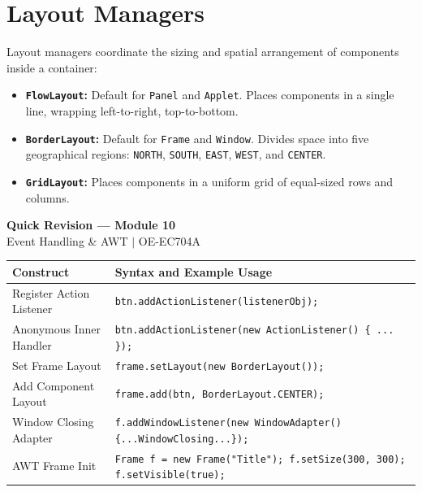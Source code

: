 \documentclass[12pt,a4paper]{article}
\renewcommand{\arraystretch}{1.45}
\begin{document}
\section{Layout Managers}

Layout managers coordinate the sizing and spatial arrangement of components inside a container:
\begin{itemize}[leftmargin=*, itemsep=3.5pt]
  \item \textbf{\texttt{FlowLayout}:} Default for \texttt{Panel} and \texttt{Applet}. Places components in a single line, wrapping left-to-right, top-to-bottom.
  \item \textbf{\texttt{BorderLayout}:} Default for \texttt{Frame} and \texttt{Window}. Divides space into five geographical regions: \texttt{NORTH}, \texttt{SOUTH}, \texttt{EAST}, \texttt{WEST}, and \texttt{CENTER}.
  \item \textbf{\texttt{GridLayout}:} Places components in a uniform grid of equal-sized rows and columns.
\end{itemize}

\newpage
\begin{center}
  {\large\bfseries\color{myred} Quick Revision --- Module 10}\\[3pt]
  {\small\color{mydark} Event Handling \& AWT $|$ OE-EC704A}
\end{center}
\noindent{\color{myred}\rule{\linewidth}{1.2pt}}
\vspace{4pt}

\begin{tcolorbox}[formulabox, title={\textbf{Event \& Layout Syntax}}]
{\renewcommand{\arraystretch}{1.3}%
\begin{tabularx}{\linewidth}{l Y}
\textbf{Construct} & \textbf{Syntax and Example Usage} \\
\hline
Register Action Listener & \texttt{btn.addActionListener(listenerObj);} \\
Anonymous Inner Handler & \texttt{btn.addActionListener(new ActionListener() \{ ... \});} \\
Set Frame Layout & \texttt{frame.setLayout(new BorderLayout());} \\
Add Component Layout & \texttt{frame.add(btn, BorderLayout.CENTER);} \\
Window Closing Adapter & \texttt{f.addWindowListener(new WindowAdapter()\{...WindowClosing...\});} \\
AWT Frame Init & \texttt{Frame f = new Frame("Title"); f.setSize(300, 300); f.setVisible(true);} \\
\end{tabularx}}
\end{tcolorbox}
\end{document}
